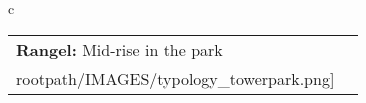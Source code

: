 \begin{table}[H]
        \begin{tabular}{c}
        \begin{tabular}{m{1.5in} m{2in}}
\textbf{Rangel:} {Mid-rise in the park} & \texttt{[image: \\rootpath/IMAGES/typology\_towerpark.png]}
\end{tabular}\end{tabular}
        \end{table}